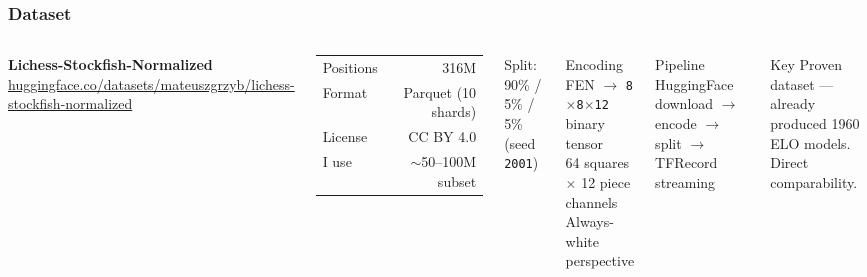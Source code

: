 \documentclass{beamer}
\begin{document}
\begin{frame}
\frametitle{Dataset}

\begin{columns}
\textbf{Lichess-Stockfish-Normalized}\\
{\footnotesize \url{huggingface.co/datasets/mateuszgrzyb/lichess-stockfish-normalized}}

\vspace{0.5em}
\begin{tabular}{lr}
\toprule
Positions & 316M \\
Format & Parquet (10 shards) \\
License & CC BY 4.0 \\
I use & $\sim$50--100M subset \\
\bottomrule
\end{tabular}

\vspace{0.5em}
Split: 90\% / 5\% / 5\% (seed \texttt{2001})

\begin{block}{Encoding}
FEN $\rightarrow$ \texttt{8$\times$8$\times$12} binary tensor\\[0.3em]
\footnotesize 64 squares $\times$ 12 piece channels\\
Always-white perspective
\end{block}

\vspace{0.5em}
\begin{block}{Pipeline}
\footnotesize
HuggingFace download $\rightarrow$ encode $\rightarrow$ split $\rightarrow$ TFRecord streaming
\end{block}

\vspace{0.5em}
\begin{block}{Key}
\footnotesize
Proven dataset --- already produced 1960 ELO models. Direct comparability.
\end{block}
\end{columns}

\end{frame}
\end{document}
